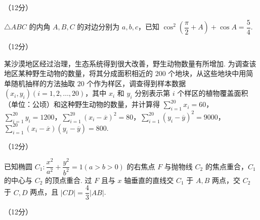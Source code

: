 \documentclass[a4paper,11pt]{report}
\begin{document}
\begin{examanswers}[start=17]
\vspace{-0.6em}
\item（12分）

$\triangle ABC$ 的内角 $A,B,C$ 的对边分别为 $a,b,c$，已知 $\cos^2\left(\dfrac{\pi}{2}+A\right)+\cos A=\dfrac54$. 


\vspace{-2.2em}
\item（12分）

某沙漠地区经过治理，生态系统得到很大改善，野生动物数量有所增加. 为调查该地区某种野生动物的数量，将其分成面积相近的 $200$ 个地块，从这些地块中用简单随机抽样的方法抽取 $20$ 个作为样区，调查得到样本数据 $(x_i,y_i)(i=1,2,\ldots,20)$，其中 $x_i$ 和 $y_i$ 分别表示第 $i$ 个样区的植物覆盖面积（单位：公顷）和这种野生动物的数量，并计算得 $\sum_{i=1}^{20}x_i=60$，$\sum_{i=1}^{20}y_i=1200$，$\sum_{i=1}^{20}(x_i-\overline{x})^2=80$，$\sum_{i=1}^{20}(y_i-\overline{y})^2=9000$，$\sum_{i=1}^{20}(x_i-\overline{x})(y_i-\overline{y})=800$.




\item（12分）

已知椭圆 $C_1:\dfrac{x^2}{a^2}+\dfrac{y^2}{b^2}=1(a>b>0)$ 的右焦点 $F$ 与抛物线 $C_2$ 的焦点重合，$C_1$ 的中心与 $C_2$ 的顶点重合. 过 $F$ 且与 $x$ 轴垂直的直线交 $C_1$ 于 $A,B$ 两点，交 $C_2$ 于 $C,D$ 两点，且 $|CD|=\dfrac43|AB|$. 



\item（12分）


\end{examanswers}
\end{document}
